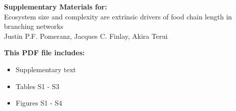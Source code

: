 \begin{center}
\LARGE{\textbf{Supplementary Materials for:}}\\[7.5mm]
\LARGE{Ecosystem size and complexity are extrinsic drivers of food chain length in branching networks}\\[7.5mm]
\large{Justin P.F. Pomeranz, Jacques C. Finlay, Akira Terui}\\[7.5mm]
\end{center}
\begin{flushleft}
\textbf{This PDF file includes:}
\begin{itemize}
\item Supplementary text
\item Tables S1 - S3
\item Figures S1 - S4
\end{itemize}
\end{flushleft}

\newpage
